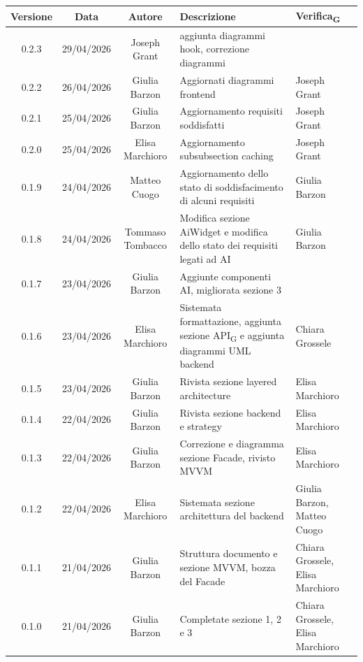\documentclass[11pt,a4paper]{article}
\newcommand{\gls}[1]{#1\textsubscript{G}}
\begin{document}
\begin{table}[H]
    \centering          
    \begin{tabular}{|c|c|c|>{\raggedright\arraybackslash}p{}|p{}|}
        \hline
        \textbf{Versione} & \textbf{Data} & \textbf{Autore} & \textbf{Descrizione} & \textbf{\gls{Verifica}} \\
        \hline
        0.2.3 & 29/04/2026 & Joseph Grant & aggiunta diagrammi hook, correzione diagrammi & \\
        \hline
        0.2.2 & 26/04/2026 & Giulia Barzon & Aggiornati diagrammi frontend & Joseph Grant \\
        \hline
        0.2.1 & 25/04/2026 & Giulia Barzon & Aggiornamento requisiti soddisfatti & Joseph Grant \\
        \hline
        0.2.0 & 25/04/2026 & Elisa Marchioro & Aggiornamento subsubsection caching & Joseph Grant \\
        \hline
        0.1.9 & 24/04/2026 & Matteo Cuogo & Aggiornamento dello stato di soddisfacimento di alcuni requisiti & Giulia Barzon\\
        \hline
        0.1.8 & 24/04/2026 & Tommaso Tombacco & Modifica sezione AiWidget e modifica dello stato dei requisiti legati ad AI & Giulia Barzon \\
        \hline
        0.1.7 & 23/04/2026 & Giulia Barzon & Aggiunte componenti AI, migliorata sezione 3 & \\
        \hline
        0.1.6 & 23/04/2026 & Elisa Marchioro & Sistemata formattazione, aggiunta sezione \gls{API} e aggiunta diagrammi UML backend & Chiara Grossele \\
        \hline
        0.1.5 & 23/04/2026 & Giulia Barzon & Rivista sezione layered architecture & Elisa Marchioro\\
        \hline
        0.1.4 & 22/04/2026 & Giulia Barzon & Rivista sezione backend e strategy & Elisa Marchioro\\
        \hline
        0.1.3 & 22/04/2026 & Giulia Barzon & Correzione e diagramma sezione Facade, rivisto MVVM & Elisa Marchioro\\
        \hline
        0.1.2 & 22/04/2026 & Elisa Marchioro & Sistemata sezione architettura del backend & Giulia Barzon, Matteo Cuogo\\
        \hline
        0.1.1 & 21/04/2026 & Giulia Barzon & Struttura documento e sezione MVVM, bozza del Facade & Chiara Grossele, Elisa Marchioro\\
        \hline
        0.1.0 & 21/04/2026 & Giulia Barzon & Completate sezione 1, 2 e 3 & Chiara Grossele, Elisa Marchioro\\

\end{tabular}
\end{table}
\end{document}

